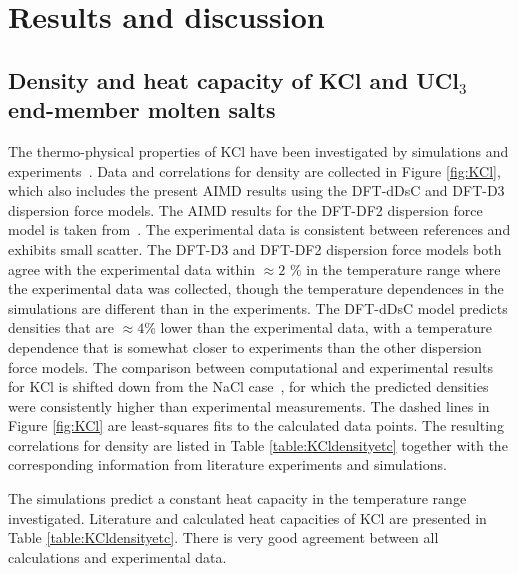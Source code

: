 \documentclass[preprint,3p,10pt,twocolumn,number,sort&compress]{elsarticle}
\begin{document}
\section{Results and discussion}
\label{sec:results}

\subsection{Density and heat capacity of KCl and UCl$_3$ end-member molten salts}
\label{sec:endmember}
The thermo-physical properties of KCl have been investigated by simulations and experiments~\cite{Janz1988,Artsdalen1955,Moon,DUEMMLER2022153414}. Data and correlations for density are collected in Figure \ref{fig:KCl}, which also includes the present AIMD results using the DFT-dDsC and DFT-D3 dispersion force models. 
The AIMD results for the DFT-DF2 dispersion force model is taken from~\cite{DUEMMLER2022153414}. The experimental data is consistent between references and exhibits small scatter. The DFT-D3 and DFT-DF2 dispersion force models both agree with the experimental data within $\approx 2$ \% in the temperature range where the experimental data was collected, though the temperature dependences in the simulations are different than in the experiments. The DFT-dDsC model predicts densities that are $\approx 4$\% lower than the experimental data, with a temperature dependence that is somewhat closer to experiments than the other dispersion force models. The comparison between computational and experimental results for KCl is shifted down from the NaCl case~\cite{Andersson}, for which the predicted densities were consistently higher than experimental measurements. The dashed lines in Figure \ref{fig:KCl} are least-squares fits to the calculated data points. The resulting correlations for density are listed in Table \ref{table:KCldensityetc} together with the corresponding information from literature experiments and simulations. 

The simulations predict a constant heat capacity in the temperature range investigated. Literature and calculated heat capacities of KCl are presented in Table \ref{table:KCldensityetc}. There is very good agreement between all calculations and experimental data. 
\end{document}
